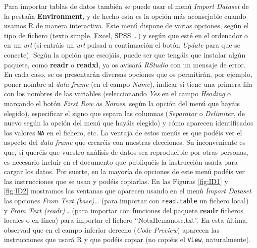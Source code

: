 \documentclass[
]{book}
\theoremstyle{definition}
\theoremstyle{definition}
\theoremstyle{definition}
\theoremstyle{remark}
\begin{document}
Para importar tablas de datos también se puede usar el menú \emph{Import Dataset} de la pestaña \textbf{Environment}, y de hecho esta es la opción más aconsejable cuando usamos R de manera interactiva. Este menú dispone de varias opciones, según el tipo de fichero (texto simple, Excel, SPSS \ldots) y según que esté en el ordenador o en un \emph{url} (si entráis un \emph{url} pulsad a continuación el botón \emph{Update} para que se conecte). Según la opción que escojáis, puede ser que tengáis que instalar algún paquete, como \textbf{readr} o \textbf{readxl}, ya os avisará \emph{RStudio} con un mensaje de error. En cada caso, se os presentarán diversas opciones que os permitirán, por ejemplo, poner nombre al \emph{data frame} (en el campo \emph{Name}), indicar si tiene una primera fila con los nombres de las variables (seleccionando \emph{Yes} en el campo \emph{Heading} o marcando el botón \emph{First Row as Names}, según la opción del menú que hayáis elegido), especificar el signo que separa las columnas (\emph{Separator} o \emph{Delimiter}, de nuevo según la opción del menú que hayáis elegido) y cómo aparecen identificados los valores \texttt{NA} en el fichero, etc. La ventaja de estos menús es que podéis ver el aspecto del \emph{data frame} que crearéis con nuestras elecciones. Su inconveniente es que, si queréis que vuestro análisis de datos sea reproducible por otras personas, es necesario incluir en el documento que publiquéis la instrucción usada para cargar los datos. Por suerte, en la mayoría de opciones de este menú podéis ver las instrucciones que se usan y podéis copiarlas. En las Figuras \ref{fig:ID1} y \ref{fig:ID2} mostramos las ventanas que aparecen usando en el menú \emph{Import Dataset} las opciones \emph{From Text (base)\ldots{}} (para importar con \texttt{read.table} un fichero local) y \emph{From Text (readr)\ldots{}} (para importar con funciones del paquete \textbf{readr} ficheros locales o en línea) para importar el fichero ``NotaHemanosc.txt''. En esta última, observad que en el campo inferior derecho (\emph{Code Preview}) aparecen las instrucciones que usará R y que podéis copiar (no copiéis el \texttt{View}, naturalmente).
\end{document}
